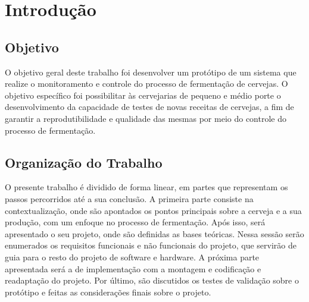 \chapter{Introdução}

\section{Objetivo}

O objetivo geral deste trabalho foi desenvolver um protótipo de um sistema que realize o monitoramento e controle do processo de fermentação de cervejas.
O objetivo específico foi possibilitar às cervejarias de pequeno e médio porte o desenvolvimento da capacidade de testes de novas receitas de cervejas, 
a fim de garantir a reprodutibilidade e qualidade das mesmas por meio do controle do processo de fermentação.


\section{Organização do Trabalho}

O presente trabalho é dividido de forma linear, em partes que representam os passos percorridos até a sua conclusão. A primeira parte consiste na contextualização, onde são apontados os pontos principais sobre a cerveja e a sua produção, com um enfoque no processo de fermentação. Após isso, será apresentado o seu projeto, onde são definidas as bases teóricas. Nessa sessão serão enumerados os requisitos funcionais e não funcionais do projeto, que servirão de guia para o resto do projeto de software e hardware. A próxima parte apresentada será a de implementação com a montagem e codificação e readaptação do projeto. Por último, são discutidos os testes de validação sobre o protótipo e feitas as considerações finais sobre o projeto.
